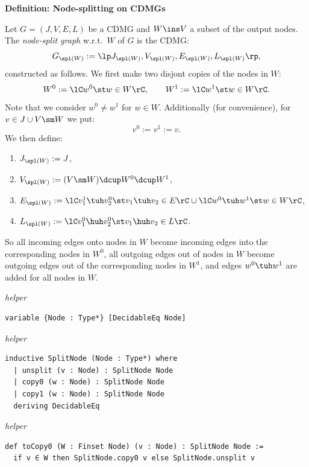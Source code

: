 \vspace{\appendixNotesGap}

\noindent\textbf{Definition: Node-splitting on CDMGs}\par\smallskip
{\appendixTexSize
  \label{def:G_node-splitting}
    Let $G=(J,V,E,L)$ be a CDMG and $W \ins V$ a subset of the output nodes.
    The \emph{node-split graph} w.r.t.\ $W$ of $G$ is the CDMG: 
    \[ G_{\spl(W)} :=\lp J_{\spl(W)}, V_{\spl(W)}, E_{\spl(W)},L_{\spl(W)} \rp,\]
    constructed as follows.
    We first make two disjont copies of the nodes in $W$:
    \[ W^0:=\lC w^0\st w \in W \rC, \qquad W^1:=\lC w^1 \st w \in W \rC.  \]
    Note that we consider $w^0 \neq w^1$ for $w \in W$.
    Additionally (for convenience), for $v \in J \cup V \sm W$ we put:
  \[ v^0:=v^1:=v.  \]
  We then define:
  \begin{enumerate}[label=\roman*.)]
      \item $J_{\spl(W)} := J$,
      \item $V_{\spl(W)} := (V \sm W) \dcup W^0 \dcup W^1$, %
      \item $E_{\spl(W)} := \lC v^1_1 \tuh v_2^0 \st v_1 \tuh v_2 \in E \rC \cup \lC w^0 \tuh w^1 \st w \in W \rC$,
      \item $L_{\spl(W)} :=\lC v_1^0 \huh v_2^0 \st v_1 \huh v_2 \in L \rC$.
  \end{enumerate}
  So all incoming edges onto nodes in $W$ become incoming edges into the corresponding nodes in $W^0$,
  all outgoing edges out of nodes in $W$ become outgoing edges out of the corresponding nodes in $W^1$,
  and edges $w^0 \tuh w^1$ are added for all nodes in $W$.
\par}
\smallskip
{\small\textit{helper}}
\begin{verbatim}
variable {Node : Type*} [DecidableEq Node]
\end{verbatim}
{\small\textit{helper}}
\begin{verbatim}
inductive SplitNode (Node : Type*) where
  | unsplit (v : Node) : SplitNode Node
  | copy0 (w : Node) : SplitNode Node
  | copy1 (w : Node) : SplitNode Node
  deriving DecidableEq
\end{verbatim}
{\small\textit{helper}}
\begin{verbatim}
def toCopy0 (W : Finset Node) (v : Node) : SplitNode Node :=
  if v ∈ W then SplitNode.copy0 v else SplitNode.unsplit v
\end{verbatim}
